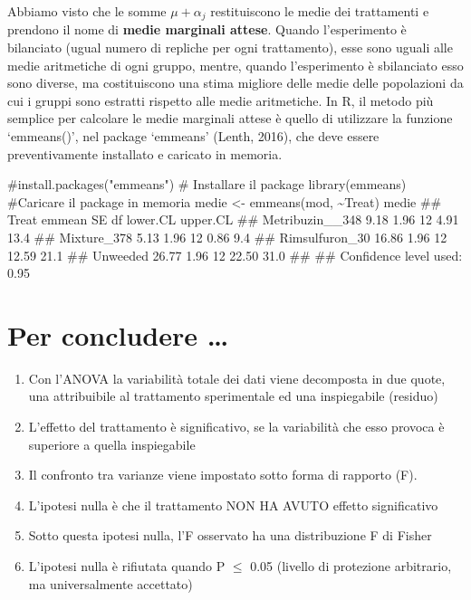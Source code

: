 \documentclass[a4paper,12pt,oneside]{book}
\providecommand{\tightlist}{%
  \setlength{\itemsep}{0pt}\setlength{\parskip}{0pt}}
\newenvironment{Shaded}{\begin{snugshade}}{\end{snugshade}}
\newcommand{\SpecialCharTok}[1]{#1}
\newcommand{\CommentTok}[1]{#1}
\newcommand{\DocumentationTok}[1]{#1}
\newcommand{\OtherTok}[1]{#1}
\newcommand{\FunctionTok}[1]{#1}
\newcommand{\NormalTok}[1]{#1}
\begin{document}
Abbiamo visto che le somme \(\mu + \alpha_j\) restituiscono le medie dei trattamenti e prendono il nome di \textbf{medie marginali attese}. Quando l'esperimento è bilanciato (ugual numero di repliche per ogni trattamento), esse sono uguali alle medie aritmetiche di ogni gruppo, mentre, quando l'esperimento è sbilanciato esso sono diverse, ma costituiscono una stima migliore delle medie delle popolazioni da cui i gruppi sono estratti rispetto alle medie aritmetiche. In R, il metodo più semplice per calcolare le medie marginali attese è quello di utilizzare la funzione `emmeans()', nel package `emmeans' (Lenth, 2016), che deve essere preventivamente installato e caricato in memoria.

\begin{Shaded}
\begin{Highlighting}[]
\CommentTok{\#install.packages("emmeans") \# Installare il package}
\FunctionTok{library}\NormalTok{(emmeans) }\CommentTok{\#Caricare il package in memoria}
\NormalTok{medie }\OtherTok{\textless{}{-}} \FunctionTok{emmeans}\NormalTok{(mod, }\SpecialCharTok{\textasciitilde{}}\NormalTok{Treat)}
\NormalTok{medie}
\DocumentationTok{\#\#  Treat           emmean   SE df lower.CL upper.CL}
\DocumentationTok{\#\#  Metribuzin\_\_348   9.18 1.96 12     4.91     13.4}
\DocumentationTok{\#\#  Mixture\_378       5.13 1.96 12     0.86      9.4}
\DocumentationTok{\#\#  Rimsulfuron\_30   16.86 1.96 12    12.59     21.1}
\DocumentationTok{\#\#  Unweeded         26.77 1.96 12    22.50     31.0}
\DocumentationTok{\#\# }
\DocumentationTok{\#\# Confidence level used: 0.95}
\end{Highlighting}
\end{Shaded}

\hypertarget{per-concludere}{%
\section{Per concludere \ldots{}}\label{per-concludere}}

\begin{enumerate}
\def\labelenumi{\arabic{enumi}.}
\tightlist
\item
  Con l'ANOVA la variabilità totale dei dati viene decomposta in due quote, una attribuibile al trattamento sperimentale ed una inspiegabile (residuo)
\item
  L'effetto del trattamento è significativo, se la variabilità che esso provoca è superiore a quella inspiegabile
\item
  Il confronto tra varianze viene impostato sotto forma di rapporto (F).
\item
  L'ipotesi nulla è che il trattamento NON HA AVUTO effetto significativo
\item
  Sotto questa ipotesi nulla, l'F osservato ha una distribuzione F di Fisher
\item
  L'ipotesi nulla è rifiutata quando P \(\leq\) 0.05 (livello di protezione arbitrario, ma universalmente accettato)
\end{enumerate}
\end{document}
